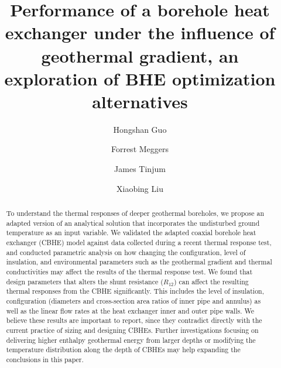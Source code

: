 \documentclass[3p]{elsarticle/elsarticle}
\begin{document}
\begin{frontmatter}
\title{Performance of a borehole heat exchanger under the influence of geothermal gradient, an exploration of BHE optimization alternatives}
\author[Group1]{Hongshan Guo}



\author[Group2]{Forrest Meggers}


\author[Group3]{James Tinjum}
\author[Group4]{Xiaobing Liu}

\address[Group1]{Andlinger Center for Energy and the Environment, Princeton University, Princeton, United States}
\address[Group2]{School of Architecture, Princeton University, Princeton, United States}



\begin{abstract}

To understand the thermal responses of deeper geothermal boreholes, we propose an adapted version of an analytical solution that incorporates the undisturbed ground temperature as an input variable. We validated the adapted coaxial borehole heat exchanger (CBHE) model against data collected during a recent thermal response test, and conducted parametric analysis on how changing the configuration, level of insulation, and environmental parameters such as the geothermal gradient and thermal conductivities may affect the results of the thermal response test. We found that design parameters that alters the shunt resistance ($R_{12}$) can affect the resulting thermal responses from the CBHE significantly. This includes the level of insulation, configuration (diameters and cross-section area ratios of inner pipe and annulus) as well as the linear flow rates at the heat exchanger inner and outer pipe walls. We believe these results are important to report, since they contradict directly with the current practice of sizing and designing  CBHEs. Further investigations focusing on delivering higher enthalpy geothermal energy from larger depths or modifying the temperature distribution along the depth of CBHEs may help expanding the conclusions in this paper.


\end{abstract}
\end{frontmatter}
\end{document}
